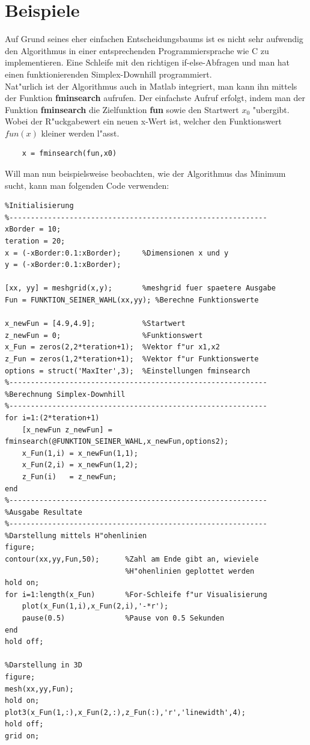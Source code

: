 \section{Beispiele}
Auf Grund seines eher einfachen Entscheidungsbaums ist es nicht sehr aufwendig den Algorithmus in einer entsprechenden Programmiersprache wie C zu implementieren. Eine Schleife mit den richtigen if-else-Abfragen und man hat einen funktionierenden Simplex-Downhill programmiert.\\
Nat"urlich ist der Algorithmus auch in Matlab integriert, man kann ihn mittels der Funktion \textbf{fminsearch} aufrufen. 
Der einfachste Aufruf erfolgt, indem man der Funktion \textbf{fminsearch} die Zielfunktion \textbf{fun} sowie den Startwert \textbf{$x_0$} "ubergibt. Wobei der R"uckgabewert ein neuen x-Wert ist, welcher den Funktionswert $fun(x)$ kleiner werden l"asst. 
\begin{lstlisting}
	x = fminsearch(fun,x0)
\end{lstlisting} 
Will man nun beispielsweise beobachten, wie der Algorithmus das Minimum sucht, kann man folgenden Code verwenden: 
\begin{lstlisting}[style=Matlab]
%------------------------------------------------------------
%Initialisierung
%------------------------------------------------------------
xBorder = 10; 
teration = 20; 
x = (-xBorder:0.1:xBorder);     %Dimensionen x und y
y = (-xBorder:0.1:xBorder); 

[xx, yy] = meshgrid(x,y);       %meshgrid fuer spaetere Ausgabe
Fun = FUNKTION_SEINER_WAHL(xx,yy); %Berechne Funktionswerte

x_newFun = [4.9,4.9];           %Startwert
z_newFun = 0;                   %Funktionswert
x_Fun = zeros(2,2*teration+1);  %Vektor f"ur x1,x2
z_Fun = zeros(1,2*teration+1);  %Vektor f"ur Funktionswerte
options = struct('MaxIter',3);  %Einstellungen fminsearch
%------------------------------------------------------------
%Berechnung Simplex-Downhill
%------------------------------------------------------------
for i=1:(2*teration+1)
	[x_newFun z_newFun] = fminsearch(@FUNKTION_SEINER_WAHL,x_newFun,options2);
	x_Fun(1,i) = x_newFun(1,1);
	x_Fun(2,i) = x_newFun(1,2); 
	z_Fun(i)   = z_newFun; 
end
%------------------------------------------------------------
%Ausgabe Resultate
%------------------------------------------------------------
%Darstellung mittels H"ohenlinien
figure; 
contour(xx,yy,Fun,50);      %Zahl am Ende gibt an, wieviele 
                            %H"ohenlinien geplottet werden
hold on; 
for i=1:length(x_Fun)       %For-Schleife f"ur Visualisierung
    plot(x_Fun(1,i),x_Fun(2,i),'-*r'); 
    pause(0.5)              %Pause von 0.5 Sekunden
end
hold off; 

%Darstellung in 3D
figure; 
mesh(xx,yy,Fun);
hold on; 
plot3(x_Fun(1,:),x_Fun(2,:),z_Fun(:),'r','linewidth',4); 
hold off; 
grid on; 
\end{lstlisting}
